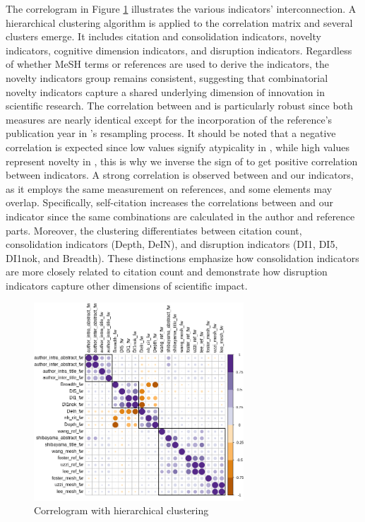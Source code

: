    


The correlogram in Figure \ref{figure:correlogram} illustrates the various indicators' interconnection. A hierarchical clustering algorithm is applied to the correlation matrix and several clusters emerge. It includes citation and consolidation indicators, novelty indicators, cognitive dimension indicators, and disruption indicators. Regardless of whether MeSH terms or references are used to derive the indicators, the novelty indicators group remains consistent, suggesting that combinatorial novelty indicators capture a shared underlying dimension of innovation in scientific research. The correlation between \cite{lee2015creativity} and \cite{uzzi2013atypical} is particularly robust since both measures are nearly identical except for the incorporation of the reference's publication year in \cite{uzzi2013atypical}'s resampling process. It should be noted that a negative correlation is expected since low values signify atypicality in \cite{uzzi2013atypical}, while high values represent novelty in \cite{lee2015creativity}, this is why we inverse the sign of \cite{uzzi2013atypical} to get positive correlation between indicators. A strong correlation is observed between \cite{shibayama2021measuring} and our indicators, as it employs the same measurement on references, and some elements may overlap. Specifically, self-citation increases the correlations between \cite{shibayama2021measuring} and our indicator since the same combinations are calculated in the author and reference parts. Moreover, the clustering differentiates between citation count, consolidation indicators (Depth, DeIN), and disruption indicators (DI1, DI5, DI1nok, and Breadth). These distinctions emphasize how consolidation indicators are more closely related to citation count and demonstrate how disruption indicators capture other dimensions of scientific impact.


\begin{figure}[h]
  \centering
  \includegraphics[width=0.7\textwidth]{2_chapter2/figures/corplot2.png}
  \caption{Correlogram with hierarchical clustering}
  \label{figure:correlogram}
\end{figure}




